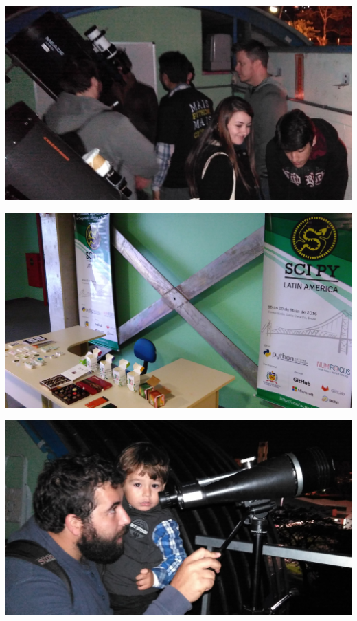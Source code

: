 \documentclass[12pt]{article}
\begin{document}
\noindent  %
\includegraphics[width=\textwidth]{social-astro.jpg}

\noindent  %
\includegraphics[width=\textwidth]{social-break.jpg}

\noindent  %
\includegraphics[width=\textwidth]{social-family.jpg}
\end{document}
